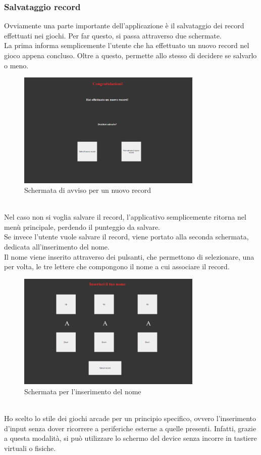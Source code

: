 \subsubsection{Salvataggio record}
Ovviamente una parte importante dell'applicazione è il salvataggio dei record effettuati nei giochi. Per far questo, si passa attraverso due schermate.\\
La prima informa semplicemente l'utente che ha effettuato un nuovo record nel gioco appena concluso. Oltre a questo, permette allo stesso di decidere se salvarlo o meno.\\
\begin{figure}[h]
    \centering
    \includegraphics[width=250pt]{images/product/schermataNuovoRecord.png}
    \caption{Schermata di avviso per un nuovo record}
    \label{fig:schermataNuovoRecord}
\end{figure}
\\Nel caso non si voglia salvare il record, l'applicativo semplicemente ritorna nel menù principale, perdendo il punteggio da salvare.\\
Se invece l'utente vuole salvare il record, viene portato alla seconda schermata, dedicata all'inserimento del nome.\\
Il nome viene inserito attraverso dei pulsanti, che permettono di selezionare, una per volta, le tre lettere che compongono il nome a cui associare il record.
\begin{figure}[h]
    \centering
    \includegraphics[width=250pt]{images/product/schermataInserimentoNome.png}
    \caption{Schermata per l'inserimento del nome}
    \label{fig:schermataInserimentoNome}
\end{figure}
\\Ho scelto lo stile dei giochi arcade per un principio specifico, ovvero l'inserimento d'input senza dover ricorrere a periferiche esterne a quelle presenti. Infatti, grazie a questa modalità, si può utilizzare lo schermo del device senza incorre in tastiere virtuali o fisiche.
